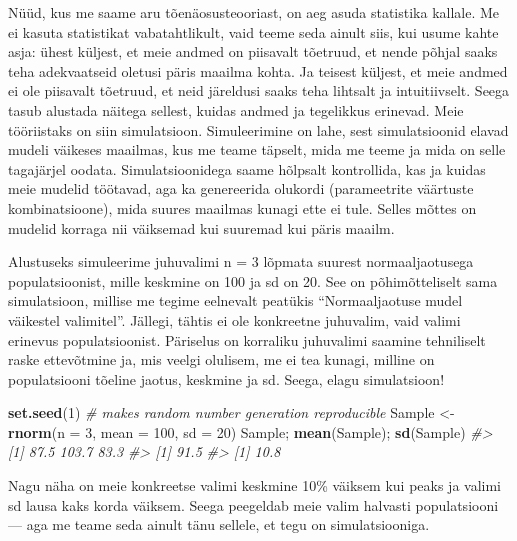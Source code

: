 \documentclass[]{book}
\newenvironment{Shaded}{\begin{snugshade}}{\end{snugshade}}
\newcommand{\CommentTok}[1]{\textcolor[rgb]{0.56,0.35,0.01}{\textit{#1}}}
\newcommand{\DataTypeTok}[1]{\textcolor[rgb]{0.13,0.29,0.53}{#1}}
\newcommand{\DecValTok}[1]{\textcolor[rgb]{0.00,0.00,0.81}{#1}}
\newcommand{\KeywordTok}[1]{\textcolor[rgb]{0.13,0.29,0.53}{\textbf{#1}}}
\newcommand{\NormalTok}[1]{#1}
\newcommand{\StringTok}[1]{\textcolor[rgb]{0.31,0.60,0.02}{#1}}
\begin{document}
Nüüd, kus me saame aru tõenäosusteooriast, on aeg asuda statistika kallale. Me ei kasuta statistikat vabatahtlikult, vaid teeme seda ainult siis, kui usume kahte asja: ühest küljest, et meie andmed on piisavalt tõetruud, et nende põhjal saaks teha adekvaatseid oletusi päris maailma kohta. Ja teisest küljest, et meie andmed ei ole piisavalt tõetruud, et neid järeldusi saaks teha lihtsalt ja intuitiivselt.
Seega tasub alustada näitega sellest, kuidas andmed ja tegelikkus erinevad. Meie tööriistaks on siin simulatsioon.
Simuleerimine on lahe, sest simulatsioonid elavad mudeli väikeses maailmas, kus me teame
täpselt, mida me teeme ja mida on selle tagajärjel oodata. Simulatsioonidega saame
hõlpsalt kontrollida, kas ja kuidas meie mudelid töötavad, aga ka genereerida olukordi (parameetrite väärtuste kombinatsioone), mida suures maailmas kunagi ette ei tule.
Selles mõttes on mudelid korraga nii väiksemad kui suuremad kui päris maailm.

Alustuseks simuleerime juhuvalimi n = 3 lõpmata suurest normaaljaotusega populatsioonist, mille keskmine on 100 ja sd on 20. See on põhimõtteliselt sama simulatsioon, millise me tegime eelnevalt peatükis ``Normaaljaotuse mudel väikestel valimitel''. Jällegi, tähtis ei ole konkreetne juhuvalim, vaid valimi erinevus populatsioonist. Päriselus on korraliku juhuvalimi saamine tehniliselt raske ettevõtmine ja, mis veelgi olulisem, me ei tea kunagi, milline on populatsiooni tõeline jaotus, keskmine ja sd. Seega, elagu simulatsioon!

\begin{Shaded}
\begin{Highlighting}[]
\KeywordTok{set.seed}\NormalTok{(}\DecValTok{1}\NormalTok{) }\CommentTok{# makes random number generation reproducible}
\NormalTok{Sample <-}\StringTok{ }\KeywordTok{rnorm}\NormalTok{(}\DataTypeTok{n =} \DecValTok{3}\NormalTok{, }\DataTypeTok{mean =} \DecValTok{100}\NormalTok{, }\DataTypeTok{sd =} \DecValTok{20}\NormalTok{)}
\NormalTok{Sample; }\KeywordTok{mean}\NormalTok{(Sample); }\KeywordTok{sd}\NormalTok{(Sample)}
\CommentTok{#> [1]  87.5 103.7  83.3}
\CommentTok{#> [1] 91.5}
\CommentTok{#> [1] 10.8}
\end{Highlighting}
\end{Shaded}

Nagu näha on meie konkreetse valimi keskmine 10\% väiksem kui peaks ja valimi sd lausa kaks korda väiksem. Seega peegeldab meie valim halvasti populatsiooni --- aga me teame seda ainult tänu sellele, et tegu on simulatsiooniga.
\end{document}
